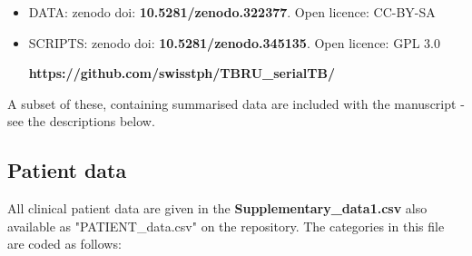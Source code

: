 \documentclass[12pt, oneside]{article}   	%
\begin{document}
\begin{itemize}
  \item DATA: zenodo doi: \textbf{10.5281/zenodo.322377}. Open licence: CC-BY-SA
  \item SCRIPTS: zenodo doi: \textbf{10.5281/zenodo.345135}. Open licence: GPL 3.0

  \textbf{https://github.com/swisstph/TBRU\_serialTB/}
\end{itemize}

\noindent A subset of these, containing summarised data are included with the manuscript - see the descriptions below.

\subsection{Patient data}
All clinical patient data are given in the \textbf{Supplementary\_data1.csv} also available as "PATIENT\_data.csv" on the repository.
The categories in this file are coded as follows:
\end{document}
